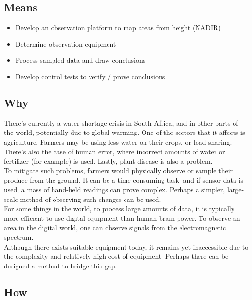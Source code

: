 \subsection{Means}

\begin{itemize}
    \item Develop an observation platform to map areas from height (NADIR)
    \item Determine observation equipment
    \item Process sampled data and draw conclusions
    \item Develop control tests to verify / prove conclusions
\end{itemize}

\subsection{Why}

There's currently a water shortage crisis in South Africa, and in other parts of the world, potentially due to global warming. One of the sectors that it affects is agriculture. Farmers may be using less water on their crops, or load sharing. There's also the case of human error, where incorrect amounts of water or fertilizer (for example) is used. Lastly, plant disease is also a problem.\\

\noindent
To mitigate such problems, farmers would physically observe or sample their produce from the ground. It can be a time consuming task, and if sensor data is used, a mass of hand-held readings can prove complex. Perhaps a simpler, large-scale method of observing such changes can be used.\\

\noindent
For some things in the world, to process large amounts of data, it is typically more efficient to use digital equipment than human brain-power. To observe an area in the digital world, one can observe signals from the electromagnetic spectrum.\\

\noindent
Although there exists suitable equipment today, it remains yet inaccessible due to the complexity and relatively high cost of equipment. Perhaps there can be designed a method to bridge this gap.

\subsection{How}

